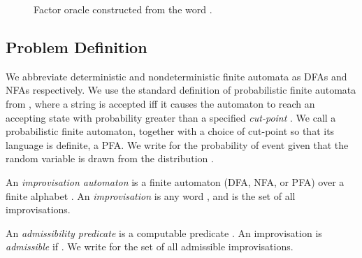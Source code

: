 \documentclass[a4paper,USenglish,numberwithinsect]{lipics}
\theoremstyle{plain}
\theoremstyle{definition}
\newcommand{\creative}{admissible}
\begin{document}
 {
\setlength{\intextsep}{8pt}
\setlength{\belowcaptionskip}{-5pt}
\setlength{\abovecaptionskip}{0pt}
\begin{figure}[tb]
\centering
{}
\caption{Factor oracle constructed from the word .}
\label{figure:factor-oracle}
\end{figure}
}
 
\subsection{Problem Definition}

We abbreviate deterministic and nondeterministic finite
automata as DFAs and NFAs respectively. 
We use the standard definition of probabilistic finite automata from
\cite{rabin-pfas}, where a string is accepted iff it causes the
automaton to reach an accepting state with probability greater than a
specified \emph{cut-point} . 
We call a probabilistic finite automaton, together with a choice of
cut-point so that its language is definite, a PFA. 
We write  for the probability of event
 given that the random variable  is drawn from the
distribution . 

\begin{definition}
An \emph{improvisation automaton} is a finite automaton (DFA, NFA, or
PFA)  over a finite alphabet . An
\emph{improvisation} is any word , and
 is the set of all improvisations. 
\label{defn:improv-auto}
\end{definition}

\begin{definition}
An \emph{admissibility predicate} is a computable predicate . An improvisation  is
\emph{\creative} if . We write  for the set of
all {\creative} improvisations. 
\label{defn:admiss}
\end{definition}
\end{document}

